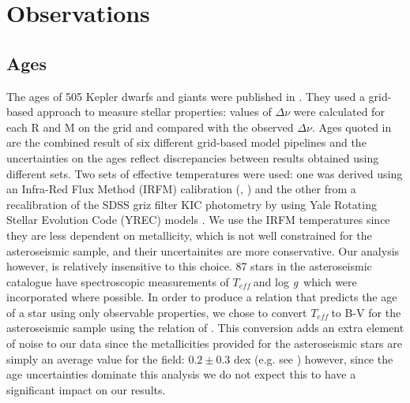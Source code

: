 \documentclass[10pt,preprint]{aastex}
\newcommand{\logg}{log \emph{g}~}
\newcommand{\teff}{$T_{eff}~$}
\begin{document}
\section{Observations}
\label{sec:data}

\subsection{Ages}
\label{sec:ages}

The ages of 505 Kepler dwarfs and giants were published in \citet{Chaplin2013}.
They used a grid-based approach to measure stellar properties: values of $\Delta\nu$ were calculated for each R and M on the grid and compared with the observed $\Delta\nu$.
Ages quoted in \citet{Chaplin2013} are the combined result of six different grid-based model pipelines and the uncertainties on the ages reflect discrepancies between results obtained using different sets.
Two sets of effective temperatures were used: one was derived using an Infra-Red Flux Method (IRFM) calibration (\citealt{Casagrande2010}, \citealt{SilvaAguirre2012}) and the other from a recalibration of the SDSS griz filter KIC photometry by \citet{Pinsonneault2012} using Yale Rotating Stellar Evolution Code (YREC) models \citep{Demarque2004}.
We use the IRFM temperatures since they are less dependent on metallicity, which is not well constrained for the asteroseismic sample, and their uncertainites are more conservative.
Our analysis however, is relatively insensitive to this choice.
87 stars in the asteroseismic catalogue have spectroscopic measurements of \teff and \logg which were incorporated where possible.
In order to produce a relation that predicts the age of a star using only observable properties, we chose to convert \teff to B-V for the asteroseismic sample using the relation of \citet{Sekiguchi2000}.
This conversion adds an extra element of noise to our data since the metallicities provided for the asteroseismic stars are simply an average value for the field: $0.2\pm0.3$ dex (e.g. see \citealt{Silva_Aguirre}) however, since the age uncertainties dominate this analysis we do not expect this to have a significant impact on our results.
\end{document}
